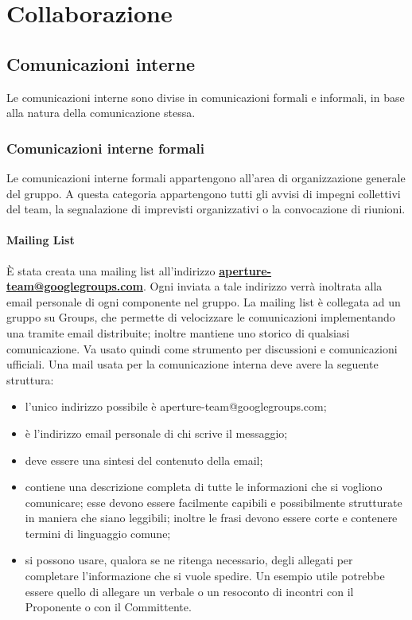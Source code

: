 \newpage
\section{Collaborazione}
\label{3.0}

\subsection{Comunicazioni interne}
\label{3.2}
Le comunicazioni interne sono divise in comunicazioni formali e informali, in base alla natura della comunicazione stessa.

\subsubsection{Comunicazioni interne formali}
Le comunicazioni interne formali appartengono all'area di organizzazione generale del gruppo. A questa categoria appartengono tutti gli avvisi di impegni collettivi del team, la segnalazione di imprevisti organizzativi o la convocazione di riunioni.

\paragraph{Mailing List}
È stata creata una mailing list all'indirizzo \textbf{\url{aperture-team@googlegroups.com}}.
Ogni  inviata a tale indirizzo verrà inoltrata alla email personale di ogni componente nel gruppo.
La mailing list è collegata ad un gruppo su  Groups, che permette di velocizzare le comunicazioni implementando una  tramite email distribuite; inoltre mantiene uno storico di qualsiasi comunicazione. Va usato quindi come strumento per discussioni e comunicazioni ufficiali.
Una mail usata per la comunicazione interna deve avere la seguente struttura:
\begin{itemize}
\item {} l'unico indirizzo possibile è aperture-team@googlegroups.com;
\item {} è l'indirizzo email personale di chi scrive il messaggio;
\item {} deve essere una sintesi del contenuto della email;
\item {} contiene una descrizione completa di tutte le informazioni che si vogliono comunicare; esse devono essere facilmente capibili e possibilmente strutturate in maniera che siano leggibili; inoltre le frasi devono essere corte e contenere termini di linguaggio comune;
\item {} si possono usare, qualora se ne ritenga necessario, degli allegati per completare l'informazione che si vuole spedire. Un esempio utile potrebbe essere quello di allegare un verbale o un resoconto di incontri con il Proponente  o con il Committente.
\end{itemize}


